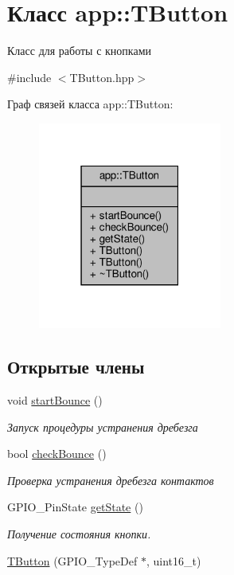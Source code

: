 \hypertarget{classapp_1_1_t_button}{}\section{Класс app\+:\+:T\+Button}
\label{classapp_1_1_t_button}


Класс для работы с кнопками  




{\ttfamily \#include $<$T\+Button.\+hpp$>$}



Граф связей класса app\+:\+:T\+Button\+:\nopagebreak
\begin{figure}[H]
\begin{center}
\leavevmode
\includegraphics[width=171pt]{classapp_1_1_t_button__coll__graph}
\end{center}
\end{figure}
\subsection*{Открытые члены}
\begin{DoxyCompactItemize}
\item 
void \hyperlink{classapp_1_1_t_button_a92fc2dcb3d54a563b7b1a96900a4717c}{start\+Bounce} ()
\begin{DoxyCompactList}\small\item\em Запуск процедуры устранения дребезга \end{DoxyCompactList}\item 
bool \hyperlink{classapp_1_1_t_button_a52714fba93672ac5690de6f9d56e9a5f}{check\+Bounce} ()
\begin{DoxyCompactList}\small\item\em Проверка устранения дребезга контактов \end{DoxyCompactList}\item 
G\+P\+I\+O\+\_\+\+Pin\+State \hyperlink{classapp_1_1_t_button_a1d6cf41ee0a98746592b1d604041f8ce}{get\+State} ()
\begin{DoxyCompactList}\small\item\em Получение состояния кнопки. \end{DoxyCompactList}\item 
\hyperlink{classapp_1_1_t_button_a846432bef1a2f5f2705eef5f95d22ae2}{T\+Button} (G\+P\+I\+O\+\_\+\+Type\+Def $\ast$, uint16\+\_\+t)
\end{DoxyCompactItemize}


